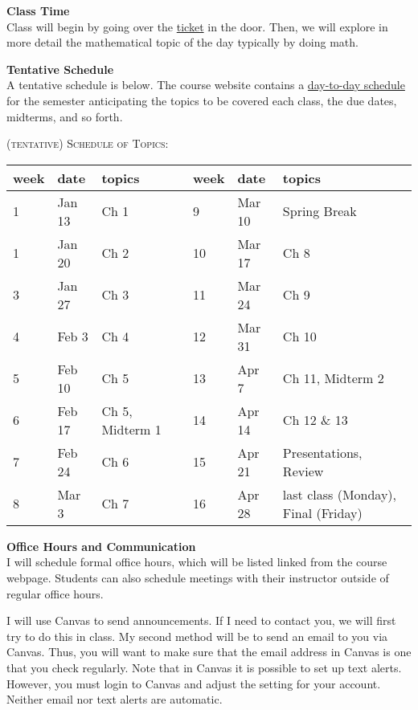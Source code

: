 \documentclass[12pt]{article}
\renewcommand{\emph}[1]{\textsf{\textbf{#1}}}
\newcommand{\localhead}[1]{\par\smallskip\textbf{#1}\nobreak\\}%
\def\heading#1{\localhead{\large\emph{#1}}}
\begin{document}
\heading{Class Time}
Class will begin by going over the \href{https://jrfaudree.github.io/HOM2025/tickets.html}{ticket} in the door. Then, we will explore in more detail the mathematical topic of the day typically by doing math.


\heading{Tentative Schedule}
A tentative schedule is below. The course website contains a \href{https://docs.google.com/spreadsheets/d/e/2PACX-1vRljb1-0lJ9CtIRxdMsZyeBSeQeEZfkl7WBYEpcGmgYnoMynhaaJGCkPKR3t-NxstMAChrq4HY-ms9D/pubhtml?gid=0&single=true}{day-to-day schedule} for the semester anticipating
the topics to be covered each class, the due dates,
midterms, and so forth. 


\textsc{(tentative) Schedule of Topics:}

\begin{tabular}{l||l|l|l|l|l|l|}
  \hline
  week&date& topics &  & week&date& topics \\
  \hline
 1& Jan 13 & Ch 1 & &9&Mar 10 & Spring Break  \\

\hline
 1& Jan 20 & Ch 2 & &10& Mar 17 & Ch 8 \\

\hline
  3& Jan 27 & Ch 3& &11& Mar 24 & Ch 9 \\

\hline
4& Feb 3 &  Ch 4 &  &12& Mar 31 & Ch 10 \\

\hline
 5& Feb 10 & Ch 5 & &13& Apr 7 & Ch 11, Midterm 2  \\

\hline
 6& Feb 17 & Ch 5, Midterm 1& &14& Apr 14 & Ch 12 \& 13  \\
\hline
 7& Feb 24 & Ch 6&  &15& Apr 21 & Presentations, Review \\
  
\hline
 8& Mar 3  & Ch 7&  &16&  Apr 28 &last class (Monday), Final (Friday) \\

\hline
\end{tabular}

\heading{Office Hours and Communication}
I will schedule formal office hours,
which will be listed linked from the course webpage. Students can also schedule meetings with their instructor outside of regular office hours. 

I will use Canvas to send announcements. If I need to contact you, we will first try to do this in class. My second method will be to send an email to you via Canvas. Thus, you will want to make sure that the email address in Canvas is one that you check regularly. Note that in Canvas it is possible to set up text alerts. However, you must login to Canvas and adjust the setting for your account. Neither email nor text alerts are automatic.
\end{document}
